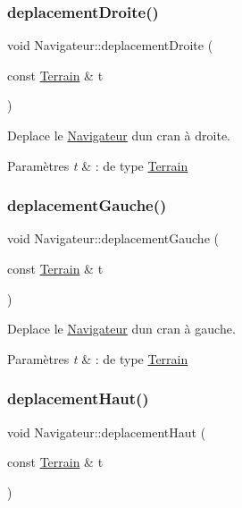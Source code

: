 \subsubsection{\texorpdfstring{deplacement\+Droite()}{deplacementDroite()}}
{\footnotesize\ttfamily void Navigateur\+::deplacement\+Droite (\begin{DoxyParamCaption}\item[{const \hyperlink{class_terrain}{Terrain} \&}]{t }\end{DoxyParamCaption})}



Deplace le \hyperlink{class_navigateur}{Navigateur} d\textquotesingle{}un cran à droite. 


\begin{DoxyParams}{Paramètres}
{\em t} & \+: de type \hyperlink{class_terrain}{Terrain} \\
\hline
\end{DoxyParams}
\mbox{\label{class_navigateur_ad70bb3a8f49254b3e1415b5fabc79473}} 
\subsubsection{\texorpdfstring{deplacement\+Gauche()}{deplacementGauche()}}
{\footnotesize\ttfamily void Navigateur\+::deplacement\+Gauche (\begin{DoxyParamCaption}\item[{const \hyperlink{class_terrain}{Terrain} \&}]{t }\end{DoxyParamCaption})}



Deplace le \hyperlink{class_navigateur}{Navigateur} d\textquotesingle{}un cran à gauche. 


\begin{DoxyParams}{Paramètres}
{\em t} & \+: de type \hyperlink{class_terrain}{Terrain} \\
\hline
\end{DoxyParams}
\mbox{\label{class_navigateur_a87c978de070d8fb88ea14c4383009246}} 
\subsubsection{\texorpdfstring{deplacement\+Haut()}{deplacementHaut()}}
{\footnotesize\ttfamily void Navigateur\+::deplacement\+Haut (\begin{DoxyParamCaption}\item[{const \hyperlink{class_terrain}{Terrain} \&}]{t }\end{DoxyParamCaption})}



